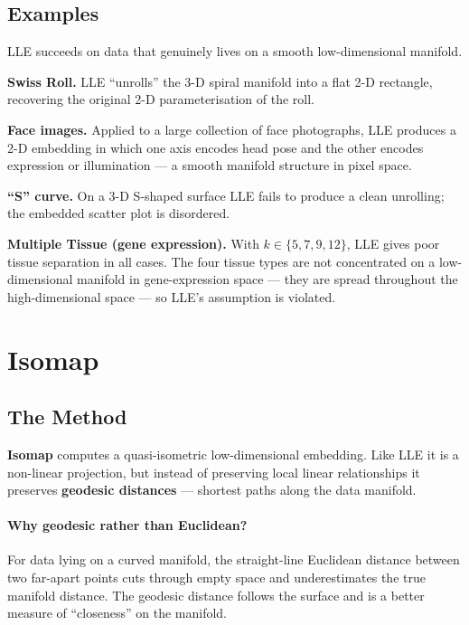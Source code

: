 \documentclass[11pt, oneside]{book}
\begin{document}
\subsection{Examples}

LLE succeeds on data that genuinely lives on a smooth low-dimensional manifold.

\textbf{Swiss Roll.} LLE ``unrolls'' the 3-D spiral manifold into a flat 2-D
rectangle, recovering the original 2-D parameterisation of the roll.

\textbf{Face images.} Applied to a large collection of face photographs, LLE
produces a 2-D embedding in which one axis encodes head pose and the other
encodes expression or illumination — a smooth manifold structure in pixel space.

\textbf{``S'' curve.} On a 3-D S-shaped surface LLE fails to produce a clean
unrolling; the embedded scatter plot is disordered.

\textbf{Multiple Tissue (gene expression).} With $k\in\{5,7,9,12\}$, LLE gives
poor tissue separation in all cases.
The four tissue types are not concentrated on a low-dimensional manifold in
gene-expression space — they are spread throughout the high-dimensional space —
so LLE's assumption is violated.

\section{Isomap}

\subsection{The Method}

\textbf{Isomap} computes a quasi-isometric low-dimensional embedding.
Like LLE it is a non-linear projection, but instead of preserving local
linear relationships it preserves \textbf{geodesic distances} — shortest
paths along the data manifold.

\paragraph{Why geodesic rather than Euclidean?}
For data lying on a curved manifold, the straight-line Euclidean distance
between two far-apart points cuts through empty space and underestimates the
true manifold distance.
The geodesic distance follows the surface and is a better measure of
``closeness'' on the manifold.
\end{document}
